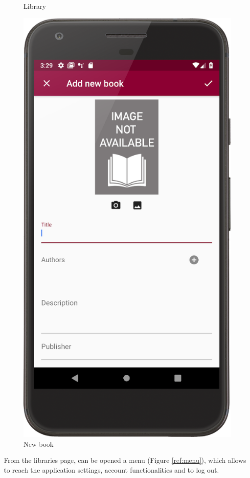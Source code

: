 \begin{figure}[!htb]
\begin{minipage}[b]{0.3\textwidth}
        \caption{Library}
        \label{ref:librarypage}
    \end{minipage}
    \hfill
    \begin{minipage}[b]{0.3\textwidth}
        \centering
        \includegraphics[scale=1]{images/add-new-book-dialog.png}
        \caption{New book}
        \label{ref:addnewbook}
    \end{minipage}
\end{figure}
From the libraries page, can be opened a menu (Figure \ref{ref:menu}), which allows to reach the application settings, 
account functionalities and to log out.

